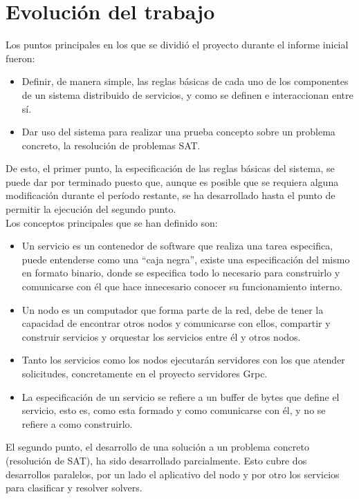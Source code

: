 \documentclass[11pt]{article}
\begin{document}
	\section{Evolución del trabajo}
		Los puntos principales en los que se dividió el proyecto durante el informe inicial fueron:
		\begin{itemize}
			\item Definir, de manera simple, 
				las reglas básicas de cada uno de los componentes de un sistema distribuido de servicios,
				y como se definen e interaccionan entre sí.
			\item Dar uso del sistema para realizar una prueba concepto sobre un problema concreto, la resolución de problemas SAT. \leavevmode \\
		\end{itemize}
		De esto, el primer punto, la especificación de las reglas básicas del sistema, se puede dar por terminado puesto que,
		aunque es posible que se requiera alguna modificación durante el período restante,
		se ha desarrollado hasta el punto de permitir la ejecución del segundo punto. \\ 

		Los conceptos principales que se han definido son:
		\begin{itemize}
			\item Un servicio es un contenedor de software que realiza una tarea especifica, puede entenderse como una ``caja negra'', existe una especificación del mismo en 
				formato binario, donde se especifica todo lo necesario para construirlo y comunicarse con él que hace innecesario conocer su funcionamiento interno.

			\item Un nodo es un computador que forma parte de la red, debe de tener la capacidad de encontrar otros nodos y comunicarse con ellos, compartir y construir servicios
				y orquestar los servicios entre él y otros nodos.

			\item Tanto los servicios como los nodos ejecutarán servidores con los que atender solicitudes, concretamente en el proyecto servidores Grpc. 
		
			\item La especificación de un servicio se refiere a un buffer de bytes que define el servicio, esto es, como esta formado y como comunicarse con él, y no se refiere a como construirlo.
		\end{itemize}

		El segundo punto, el desarrollo de una solución a un problema concreto (resolución de SAT), ha sido desarrollado parcialmente.
		Esto cubre dos desarrollos paralelos, por un lado el aplicativo del nodo y por otro los servicios para clasificar
		y resolver solvers. \\
\end{document}
